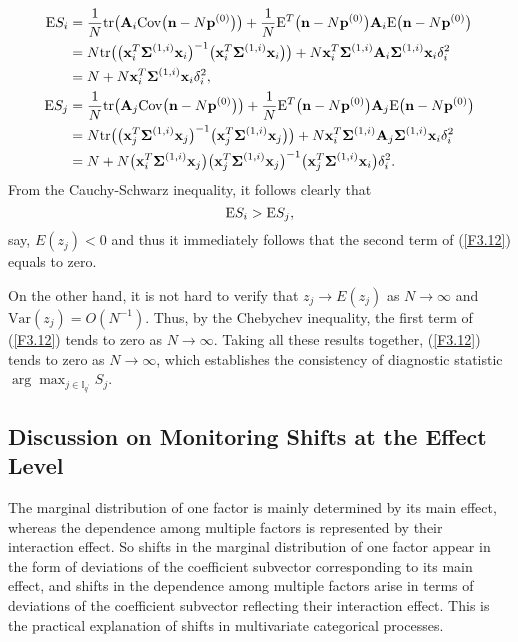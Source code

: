 \begin{align*}
\mathrm{E} S_i=&\;\frac{1}{N}\mathrm{tr}\big({\bf A}_i\mathrm{Cov}\big({\bf n}-N{\bf
p}^{(0)}\big)\big)+\frac{1}{N}\mathrm{E}^T\big({\bf n}-N{\bf
p}^{(0)}\big){\bf A}_i\mathrm{E}\big({\bf n}-N{\bf p}^{(0)}\big)\\
=&\;N\mathrm{tr}\big(\big({\bf x}_i^T\boldsymbol{\Sigma}^{(1,i)}{\bf x}_i\big)^{-1}\big({\bf
x}_i^T\boldsymbol{\Sigma}^{(1,i)}{\bf x}_i\big)\big)+N{\bf x}_i^T\boldsymbol{\Sigma}^{(1,i)}{\bf
A}_i\boldsymbol{\Sigma}^{(1,i)}{\bf x}_i\delta_i^2\\
=&\;N+N{\bf x}_i^T\boldsymbol{\Sigma}^{(1,i)}{\bf x}_i\delta_i^2,\\
\mathrm{E} S_j=&\;\frac{1}{N}\mathrm{tr}\big({\bf A}_j\mathrm{Cov}\big({\bf n}-N{\bf
p}^{(0)}\big)\big)+\frac{1}{N}\mathrm{E}^T\big({\bf n}-N{\bf
p}^{(0)}\big){\bf A}_j\mathrm{E}\big({\bf n}-N{\bf p}^{(0)}\big)\\
=&\;N\mathrm{tr}\big(\big({\bf x}_j^T\boldsymbol{\Sigma}^{(1,i)}{\bf x}_j\big)^{-1}\big({\bf
x}_j^T\boldsymbol{\Sigma}^{(1,i)}{\bf x}_j\big)\big)+N{\bf x}_i^T\boldsymbol{\Sigma}^{(1,i)}{\bf
A}_j\boldsymbol{\Sigma}^{(1,i)}{\bf x}_i\delta_i^2\\
=&\;N+N\big({\bf x}_i^T\boldsymbol{\Sigma}^{(1,i)}{\bf x}_j\big)\big({\bf
x}_j^T\boldsymbol{\Sigma}^{(1,i)}{\bf x}_j\big)^{-1}\big({\bf x}_j^T\boldsymbol{\Sigma}^{(1,i)}{\bf
x}_i\big)\delta_i^2.
\end{align*}
From the Cauchy-Schwarz inequality, it follows clearly that
\[
\mathrm{E} S_i>\mathrm{E} S_j,
\]
say, $E(z_j)<0$ and thus it immediately follows that the second term of
(\ref{F3.12}) equals to zero.

On the other hand, it is not hard to verify that $z_j\rightarrow E(z_j)$ as
$N\rightarrow \infty$ and ${\mathrm {Var}}(z_j)= O(N^{-1})$. Thus, by the Chebychev
inequality, the first term of (\ref{F3.12}) tends to zero as $N\rightarrow \infty$.
Taking all these results together, (\ref{F3.12}) tends to zero as $N\rightarrow
\infty$, which establishes the consistency of diagnostic statistic
$\arg\max_{j\in\mathbb{I}_{q^{\prime}}}S_j$.



\subsection{Discussion on Monitoring Shifts at the Effect Level}

The marginal distribution of one factor is mainly determined by its main effect,
whereas the dependence among multiple factors is represented by their interaction
effect. So shifts in the marginal distribution of one factor appear in the form of
deviations of the coefficient subvector corresponding to its main effect, and shifts
in the dependence among multiple factors arise in terms of deviations of the
coefficient subvector reflecting their interaction effect. This is the practical
explanation of shifts in multivariate categorical processes.

